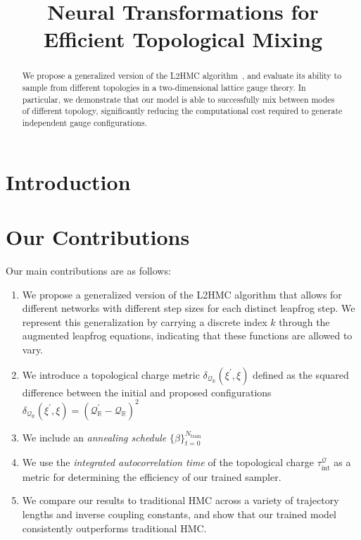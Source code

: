 \documentclass{article} %
\title{Neural Transformations for \\Efficient Topological Mixing}%
\author{Sam Foreman, Xiao-Yong Jin\& James Osborn\thanks{\hyperref{%
      https://github.com/saforem2/l2hmc-qcd
   }{https://github.com/saforem2/l2hmc-qcd} \\
   Leadership Computing Facility\\
   Argonne National Laboratory\\
   Lemont, IL 60439
   \texttt{\{foremans,xjin,\}@anl.gov},%
   \texttt{\{osborn\}@alcf.anl.gov}\\
}}
\begin{document}
\maketitle

\begin{abstract}
   We propose a generalized version of the L2HMC algorithm~\citep{levy2017}, and evaluate its ability to sample from
   different topologies in a two-dimensional lattice gauge theory.
   In particular, we demonstrate that our model is able to successfully mix between modes of different topology,
   significantly reducing the computational cost required to generate independent gauge configurations.
\end{abstract}

\section{\label{sec:introduction}Introduction}
\color{red}{TODO: Complete introduction}\color{black}
%
\section{\label{sec:our_contributions}Our Contributions}
Our main contributions are as follows:
\begin{enumerate}
   \item We propose a generalized version of the L2HMC algorithm that allows for different networks with different step
      sizes for each distinct leapfrog step. We represent this generalization by carrying a discrete index \(k\) through
      the augmented leapfrog equations, indicating that these functions are allowed to vary.
   \item We introduce a topological charge metric \(\delta_{\mathcal{Q}_{\mathbb{R}}}(\xi^{\prime}, \xi)\) defined as
      the squared difference between the initial and proposed configurations
      \(\delta_{\mathcal{Q}_{\mathbb{R}}}(\xi^{\prime}, \xi) = {\left(\mathcal{Q}_{\mathbb{R}}^{\prime} -
      \mathcal{Q}_{\mathbb{R}}\right)}^{2}\)
   \item We include an \emph{annealing schedule} \({\{\beta\}}_{t=0}^{N_{\mathrm{train}}}\)
   \item We use the \emph{integrated autocorrelation time} of the topological charge
      \(\tau_{\mathrm{int}}^{\mathcal{Q}}\) as a metric for determining the efficiency of our trained sampler.
   \item We compare our results to traditional HMC across a variety of trajectory lengths and inverse coupling
      constants, and show that our trained model consistently outperforms traditional HMC.\@
\end{enumerate}
%
\end{document}
